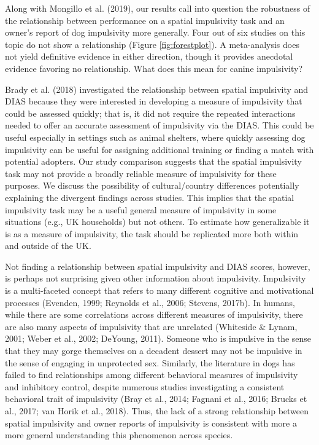 \documentclass[
  pub,floatsintext]{apa6}
\begin{document}
Along with Mongillo et al. (2019), our results call into question the robustness of the relationship between performance on a spatial impulsivity task and an owner's report of dog impulsivity more generally. Four out of six studies on this topic do not show a relationship (Figure \ref{fig:forestplot}). A meta-analysis does not yield definitive evidence in either direction, though it provides anecdotal evidence favoring no relationship. What does this mean for canine impulsivity?

Brady et al. (2018) investigated the relationship between spatial impulsivity and DIAS because they were interested in developing a measure of impulsivity that could be assessed quickly; that is, it did not require the repeated interactions needed to offer an accurate assessment of impulsivity via the DIAS. This could be useful especially in settings such as animal shelters, where quickly assessing dog impulsivity can be useful for assigning additional training or finding a match with potential adopters. Our study comparison suggests that the spatial impulsivity task may not provide a broadly reliable measure of impulsivity for these purposes. We discuss the possibility of cultural/country differences potentially explaining the divergent findings across studies. This implies that the spatial impulsivity task may be a useful general measure of impulsivity in some situations (e.g., UK households) but not others. To estimate how generalizable it is as a measure of impulsivity, the task should be replicated more both within and outside of the UK.

Not finding a relationship between spatial impulsivity and DIAS scores, however, is perhaps not surprising given other information about impulsivity. Impulsivity is a multi-faceted concept that refers to many different cognitive and motivational processes (Evenden, 1999; Reynolds et al., 2006; Stevens, 2017b). In humans, while there are some correlations across different measures of impulsivity, there are also many aspects of impulsivity that are unrelated (Whiteside \& Lynam, 2001; Weber et al., 2002; DeYoung, 2011). Someone who is impulsive in the sense that they may gorge themselves on a decadent dessert may not be impulsive in the sense of engaging in unprotected sex. Similarly, the literature in dogs has failed to find relationships among different behavioral measures of impulsivity and inhibitory control, despite numerous studies investigating a consistent behavioral trait of impulsivity (Bray et al., 2014; Fagnani et al., 2016; Brucks et al., 2017; van Horik et al., 2018). Thus, the lack of a strong relationship between spatial impulsivity and owner reports of impulsivity is consistent with more a more general understanding this phenomenon across species.
\end{document}
